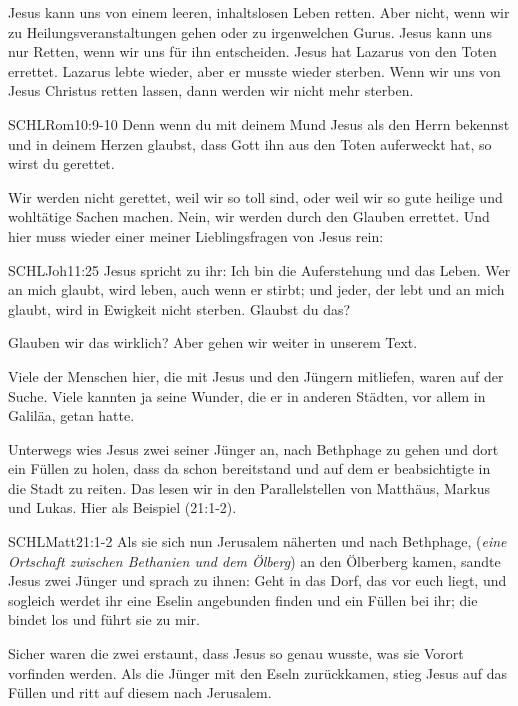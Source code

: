 \documentclass[fontsize=16pt]{mybib}
\begin{document}
    Jesus kann uns von einem leeren, inhaltslosen Leben retten. Aber nicht, wenn wir zu Heilungsveranstaltungen gehen oder zu irgenwelchen Gurus. Jesus kann uns nur Retten, wenn wir uns für ihn entscheiden. Jesus hat Lazarus von den Toten errettet. Lazarus lebte wieder, aber er musste wieder sterben. Wenn wir uns von Jesus Christus retten lassen, dann werden wir nicht mehr sterben.
    \begin{bibelbox}{SCHL}{Rom}{10:9-10}
    Denn wenn du mit deinem Mund Jesus als den Herrn bekennst und in deinem Herzen glaubst, dass Gott ihn aus den Toten auferweckt hat, so wirst du gerettet.
    \end{bibelbox}
    Wir werden nicht gerettet, weil wir so toll sind, oder weil wir so gute heilige und wohltätige Sachen machen. Nein, wir werden durch den Glauben errettet.
    Und hier muss wieder einer meiner Lieblingsfragen von Jesus rein:
    \begin{bibelbox}{SCHL}{Joh}{11:25}
    Jesus spricht zu ihr: Ich bin die Auferstehung und das Leben. Wer an mich glaubt, wird leben, auch wenn er stirbt; und jeder, der lebt und an mich glaubt, wird in Ewigkeit nicht sterben. Glaubst du das?
    \end{bibelbox}
    Glauben wir das wirklich? Aber gehen wir weiter in unserem Text.

    Viele der Menschen hier, die mit Jesus und den Jüngern mitliefen, waren auf der Suche. Viele kannten ja seine Wunder, die er in anderen Städten, vor allem in Galiläa, getan hatte. 

    Unterwegs wies Jesus zwei seiner Jünger an, nach Bethphage zu gehen und dort ein Füllen zu holen, dass da schon bereitstand und auf dem er beabsichtigte in die Stadt zu reiten. Das lesen wir in den Parallelstellen von Matthäus, Markus und Lukas. Hier als Beispiel (21:1-2).
    \begin{bibelbox}{SCHL}{Matt}{21:1-2}
    Als sie sich nun Jerusalem näherten und nach Bethphage, (\textit{eine Ortschaft zwischen Bethanien und dem Ölberg}) an den Ölberberg kamen, sandte Jesus zwei Jünger und sprach zu ihnen: Geht in das Dorf, das vor euch liegt, und sogleich werdet ihr eine Eselin angebunden finden und ein Füllen bei ihr; die bindet los und führt sie zu mir.
    \end{bibelbox}
    Sicher waren die zwei erstaunt, dass Jesus so genau wusste, was sie Vorort vorfinden werden. Als die Jünger mit den Eseln zurückkamen, stieg Jesus auf das Füllen und ritt auf diesem nach Jerusalem.
\end{document}
